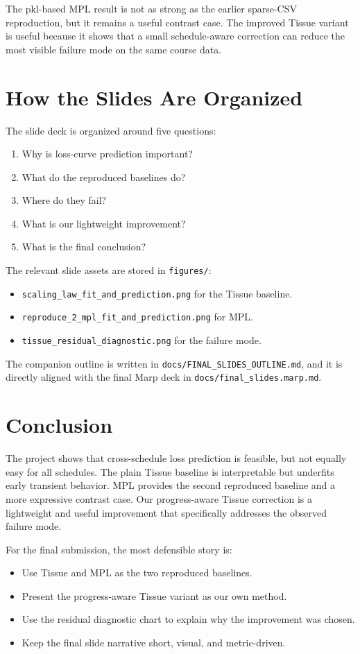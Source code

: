 ﻿\documentclass[11pt]{article}
\begin{document}
The pkl-based MPL result is not as strong as the earlier sparse-CSV reproduction, but it remains a useful contrast case. The improved Tissue variant is useful because it shows that a small schedule-aware correction can reduce the most visible failure mode on the same course data.

\section{How the Slides Are Organized}

The slide deck is organized around five questions:

\begin{enumerate}
  \item Why is loss-curve prediction important?
  \item What do the reproduced baselines do?
  \item Where do they fail?
  \item What is our lightweight improvement?
  \item What is the final conclusion?
\end{enumerate}

The relevant slide assets are stored in \texttt{figures/}:

\begin{itemize}
  \item \texttt{scaling\_law\_fit\_and\_prediction.png} for the Tissue baseline.
  \item \texttt{reproduce\_2\_mpl\_fit\_and\_prediction.png} for MPL.
  \item \texttt{tissue\_residual\_diagnostic.png} for the failure mode.
\end{itemize}

The companion outline is written in \texttt{docs/FINAL\_SLIDES\_OUTLINE.md}, and it is directly aligned with the final Marp deck in \texttt{docs/final\_slides.marp.md}.

\section{Conclusion}

The project shows that cross-schedule loss prediction is feasible, but not equally easy for all schedules. The plain Tissue baseline is interpretable but underfits early transient behavior. MPL provides the second reproduced baseline and a more expressive contrast case. Our progress-aware Tissue correction is a lightweight and useful improvement that specifically addresses the observed failure mode.

For the final submission, the most defensible story is:

\begin{itemize}
  \item Use Tissue and MPL as the two reproduced baselines.
  \item Present the progress-aware Tissue variant as our own method.
  \item Use the residual diagnostic chart to explain why the improvement was chosen.
  \item Keep the final slide narrative short, visual, and metric-driven.
\end{itemize}
\end{document}
